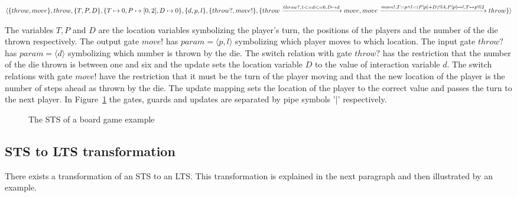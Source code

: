 $\langle\{throw, move\},throw,\{T, P, D\},\{T \mapsto 0, P \mapsto [0, 2], D \mapsto 0\},\{d, p, l\},\{throw?, move!\},\\
\{throw\xrightarrow{throw?, 1 <= d <= 6, D \mapsto d}move, move\xrightarrow{move!, T=p \land l=(P[p]+D)\%4, P[p] \mapsto l, T \mapsto p\%2}throw\}\rangle$

The variables $T, P$ and $D$ are the location variables symbolizing the player's turn, the positions of the players and the number of the die thrown respectively. The output gate $move!$ has $param = \langle p, l\rangle$ symbolizing which player moves to which location. The input gate $throw?$ has $param = \langle d\rangle$ symbolizing which number is thrown by the die. The switch relation with gate $throw?$ has the restriction that the number of the die thrown is between one and six and the update sets the location variable $D$ to the value of interaction variable $d$. The switch relations with gate $move!$ have the restriction that it must be the turn of the player moving and that the new location of the player is the number of steps ahead as thrown by the die. The update mapping sets the location of the player to the correct value and passes the turn to the next player. In Figure~\ref{fig:example_sts} the gates, guards and updates are separated by pipe symbols '|' respectively.

\begin{figure}[h]
  \begin{center}
    
  \end{center}
  \caption{The STS of a board game example}
  \label{fig:example_sts}
\end{figure}

\subsection{STS to LTS transformation}\label{sec:sts_lts_trafo}
There exists a transformation of an STS to an LTS. This transformation is explained in the next paragraph and then illustrated by an example.

